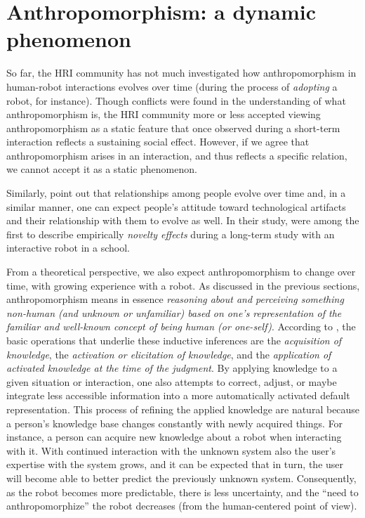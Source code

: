 \documentclass{frontiersSCNS} %
\begin{document}
\section{Anthropomorphism: a dynamic phenomenon}
\label{sec:our-ideas}

So far, the HRI community has not much investigated how anthropomorphism in
human-robot interactions evolves over time (during the process of
\emph{adopting} a robot, for instance). Though conflicts were
found in the understanding of what anthropomorphism is, the HRI
community more or less accepted viewing anthropomorphism as a static feature
that once observed during a short-term interaction reflects a sustaining social
effect. However, if we agree that anthropomorphism arises in an interaction, and thus reflects a specific relation, we cannot accept it as a static phenomenon.

Similarly, \citet{kanda_interactive_2004} point out that relationships among
people evolve over time and, in a similar manner, one can expect people's attitude toward
technological artifacts and their relationship with them to evolve as well.
In their study, \citet{kanda_interactive_2004} were among the first to
describe empirically \emph{novelty effects} during a long-term study with an
interactive robot in a school.

From a theoretical perspective, we also expect anthropomorphism to change over
time, with growing experience with a robot. As discussed in the previous
sections, anthropomorphism means in essence \emph{reasoning about and perceiving
something non-human (and unknown or unfamiliar) based on one's
representation of the familiar and well-known concept of being human (or
one-self)}. According to \citet{epley_when_2008}, the basic operations that
underlie these inductive inferences are the \emph{acquisition of knowledge}, the
\emph{activation or elicitation of knowledge}, and the \emph{application of
activated knowledge at the time of the judgment}. By applying knowledge to a
given situation or interaction, one also attempts to correct,
adjust, or maybe integrate less accessible information into a more automatically
activated default representation.
This process of refining the applied knowledge are natural because a person's knowledge base changes constantly with newly
acquired things. For instance, a person can acquire new knowledge about a robot when interacting with it. With continued interaction with the unknown system also the user's expertise with the system grows, and it can be expected that in turn, the user will become able to better predict the previously unknown system. Consequently, as the robot becomes more predictable, there is less uncertainty, and the ``need to anthropomorphize'' the robot decreases (from the
human-centered point of view).
\end{document}
